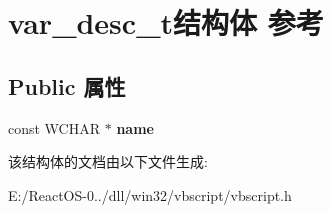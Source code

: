 \hypertarget{structvar__desc__t}{}\section{var\+\_\+desc\+\_\+t结构体 参考}
\label{structvar__desc__t}
\subsection*{Public 属性}
\begin{DoxyCompactItemize}
\item 
\mbox{\label{structvar__desc__t_aa1abc5fbe6a9cf7cb2f61e71a142ab07}} 
const W\+C\+H\+AR $\ast$ {\bfseries name}
\end{DoxyCompactItemize}


该结构体的文档由以下文件生成\+:\begin{DoxyCompactItemize}
\item 
E\+:/\+React\+O\+S-\/0../dll/win32/vbscript/vbscript.\+h\end{DoxyCompactItemize}
